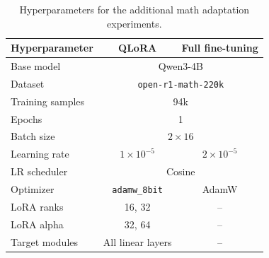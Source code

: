 \documentclass[11pt]{article}
\begin{document}
\begin{table}[h]
\centering
\small
\begin{tabular}{lcc}
\toprule
\textbf{Hyperparameter} & \textbf{QLoRA} & \textbf{Full fine-tuning} \\
\midrule
Base model & \multicolumn{2}{c}{Qwen3-4B} \\
Dataset & \multicolumn{2}{c}{\texttt{open-r1-math-220k}} \\
Training samples & \multicolumn{2}{c}{94k} \\
Epochs & \multicolumn{2}{c}{1} \\
Batch size & \multicolumn{2}{c}{$2 \times 16$} \\
Learning rate & $1\times10^{-5}$ & $2\times10^{-5}$ \\
LR scheduler & \multicolumn{2}{c}{Cosine} \\
Optimizer & \texttt{adamw\_8bit} & AdamW \\
LoRA ranks & 16, 32 & -- \\
LoRA alpha & 32, 64 & -- \\
Target modules & All linear layers & -- \\
\bottomrule
\end{tabular}
\caption{Hyperparameters for the additional math adaptation experiments.}
\label{tab:math-hyperparameters}
\end{table}
\end{document}
